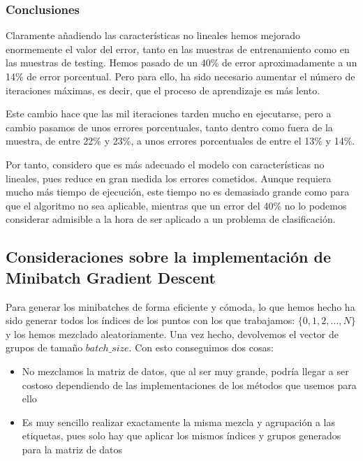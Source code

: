 \documentclass[11pt]{article}
\begin{document}
\subsubsection{Conclusiones}

Claramente añadiendo las características no lineales hemos mejorado enormemente el valor del error, tanto en las muestras de entrenamiento como en las muestras de testing. Hemos pasado de un 40\% de error aproximadamente a un 14\% de error porcentual. Pero para ello, ha sido necesario aumentar el número de iteraciones máximas, es decir, que el proceso de aprendizaje es más lento.

Este cambio hace que las mil iteraciones tarden mucho en ejecutarse, pero a cambio pasamos de unos errores porcentuales, tanto dentro como fuera de la muestra, de entre 22\% y 23\%, a unos errores porcentuales de entre el 13\%  y 14\%.

Por tanto, considero que es más adecuado el modelo con características no lineales, pues reduce en gran medida los errores cometidos. Aunque requiera mucho más tiempo de ejecución, este tiempo no es demasiado grande como para que el algoritmo no sea aplicable, mientras que un error del 40\% no lo podemos considerar admisible a la hora de ser aplicado a un problema de clasificación.

\pagebreak

\subsection{Consideraciones sobre la implementación de Minibatch Gradient Descent}

Para generar los minibatches de forma eficiente y cómoda, lo que hemos hecho ha sido generar todos los índices de los puntos con los que trabajamos: $\{0, 1, 2, \ldots, N\}$ y los hemos mezclado aleatoriamente. Una vez hecho, devolvemos el vector de grupos de tamaño $batch\_size$. Con esto conseguimos dos cosas:

\begin{itemize}
    \item No mezclamos la matriz de datos, que al ser muy grande, podría llegar a ser costoso dependiendo de las implementaciones de los métodos que usemos para ello
    \item Es muy sencillo realizar exactamente la misma mezcla y agrupación a las etiquetas, pues solo hay que aplicar los mismos índices y grupos generados para la matriz de datos
\end{itemize}
\end{document}
